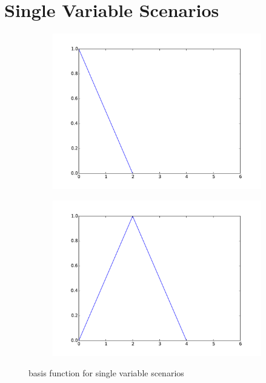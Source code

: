 \documentclass{article}
\begin{document}
\section{Single Variable Scenarios}
\begin{figure}
\centering
\begin{subfigure}{0.45\textwidth}
\centering
\includegraphics[width=\textwidth]{basis_1.pdf}
\end{subfigure}
\begin{subfigure}{0.45\textwidth}
\centering
\includegraphics[width=\textwidth]{basis_2.pdf}
\end{subfigure}
\caption{basis function for single variable scenarios}\label{basisSingle}
\end{figure}
\end{document}
